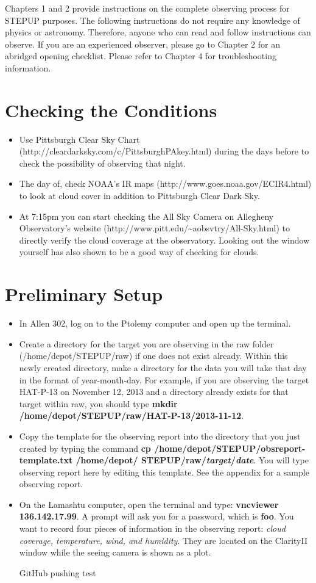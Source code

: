 \documentclass[11pt]{report}
\begin{document}
Chapters 1 and 2 provide instructions on the complete observing process for STEPUP purposes. The following instructions do not require any knowledge of physics or astronomy. Therefore, anyone who can read and follow instructions can observe. If you are an experienced observer, please go to Chapter 2 for an abridged opening checklist. Please refer to Chapter 4 for troubleshooting information.

\section{Checking the Conditions}

\begin{itemize}
\item Use Pittsburgh Clear Sky Chart (http://cleardarksky.com/c/PittsburghPAkey.html) during the days before to check the possibility of observing that night. 
\item The day of, check NOAA's IR maps (http://www.goes.noaa.gov/ECIR4.html) to look at cloud cover in addition to Pittsburgh Clear Dark Sky.
\item At 7:15pm you can start checking the All Sky Camera on Allegheny Observatory's website (http://www.pitt.edu/{\textasciitilde}aobsvtry/All-Sky.html) to directly verify the cloud coverage at the observatory. Looking out the window yourself has also shown to be a good way of checking for clouds.
\end{itemize}

\section{Preliminary Setup}

\begin{itemize}
\item In Allen 302, log on to the Ptolemy computer and open up the terminal.
\item Create a directory for the target you are observing in the raw folder (/home/depot/STEPUP/raw) if one does not exist already. Within this newly created directory, make a directory for the data you will take that day in the format of year-month-day. For example, if you are observing the target HAT-P-13 on November 12, 2013 and a directory already exists for that target within raw, you should type {\bf mkdir /home/depot/STEPUP/raw/HAT-P-13/2013-11-12\bf}.
\item Copy the template for the observing report into the directory that you just created by typing the command {\bf cp /home/depot/STEPUP/obsreport-template.txt /home/depot/ \bf} {\bf STEPUP/raw/\emph{target}/\emph{date}\bf}. You will type observing report here by editing this template. See the appendix for a sample observing report.
\item On the Lamashtu computer, open the terminal and type: {\bf vncviewer 136.142.17.99}. A prompt will ask you for a password, which is {\bf foo}. You want to record four pieces of information in the observing report: \emph{cloud coverage, temperature, wind, and humidity}. They are located on the ClarityII window while the seeing camera is shown as a plot. 

GitHub pushing test
\end{itemize}
	
\end{document}
